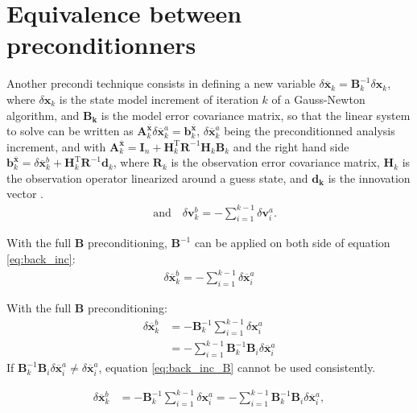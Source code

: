 \documentclass[npg, manuscript]{copernicus}
\begin{document}
\section{Equivalence between preconditionners}
Another precondi technique consists in defining a new variable $\delta \overline{\mathbf{x}}_k = \mathbf{B}_k^{-1} \delta \mathbf{x}_k$, where $\delta \mathbf{x}_k$ is the state model increment of iteration $k$ of a Gauss-Newton algorithm, and $\mathbf{B_k}$ is the model error covariance matrix, so that the linear system to solve can be written as $\mathbf{A}^{\overline{\mathbf{x}}}_k \delta \overline{\mathbf{x}}^a_k = \mathbf{b}^{\overline{\mathbf{x}}}_k$, $\delta \overline{\mathbf{x}}^a_k$ being the preconditionned analysis increment, and with $\mathbf{A}^{\overline{\mathbf{x}}}_k = \mathbf{I}_n + \mathbf{H}_k^\mathrm{T} \mathbf{R}^{-1} \mathbf{H}_k \mathbf{B}_k$ and the right hand side $\mathbf{b}^{\overline{\mathbf{x}}}_k =  \delta \overline{\mathbf{x}}^b_k + \mathbf{H}_k^\mathrm{T} \mathbf{R}^{-1} \mathbf{d}_k$, where $\mathbf{R}_k$ is the observation error covariance matrix, $\mathbf{H}_k$ is the observation operator linearized around a guess state, and $\mathbf{d_k}$ is the innovation vector \cite{selime}\cite{dereber}. 
\begin{align}
 \quad \textrm{and} \quad \delta \mathbf{v}^b_k = - \sum_{i=1}^{k-1} \delta \mathbf{v}^a_i .
\label{eq:inc_recur}
\end{align}


With the full $\mathbf{B}$ preconditioning, $\mathbf{B}^{-1}$ can be applied on both side of equation \eqref{eq:back_inc}:
\begin{align}
\label{eq:back_inc_B}
\boxed{\delta \overline{\mathbf{x}}^b_k = - \sum_{i=1}^{k-1} \delta \overline{\mathbf{x}}^a_i}
\end{align}

With the full $\mathbf{B}$ preconditioning:
\begin{align}
\label{eq:back_inc_B_diff}
\delta \overline{\mathbf{x}}^b_k & = - \mathbf{B}_k^{-1}\sum_{i=1}^{k-1} \delta \mathbf{x}^a_i \nonumber \\
& = - \sum_{i=1}^{k-1} \mathbf{B}_k^{-1} \mathbf{B}_i \delta \overline{\mathbf{x}}^a_i
\end{align}
If $\mathbf{B}_k^{-1} \mathbf{B}_i \delta \overline{\mathbf{x}}^a_i \ne \delta \overline{\mathbf{x}}^a_i$, equation \eqref{eq:back_inc_B} cannot be used consistently.

\begin{align}
\label{eq:back_inc_B_diff}
\delta \overline{\mathbf{x}}^b_k & = - \mathbf{B}_k^{-1}\sum_{i=1}^{k-1} \delta \mathbf{x}^a_i = - \sum_{i=1}^{k-1} \mathbf{B}_k^{-1} \mathbf{B}_i \delta \overline{\mathbf{x}}^a_i,
\end{align}
\end{document}
